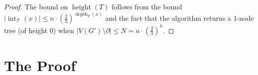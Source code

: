 \documentclass{patmorin}
\newcommand{\pat}[1]{\textcolor{Blue}{[Pat: #1]}}
\DeclareMathOperator{\sep}{sn}
\DeclareMathOperator{\tw}{tw}
\DeclareMathOperator{\depth}{depth}
\DeclareMathOperator{\height}{height}
\DeclareMathOperator{\interior}{int}
\begin{document}
\begin{proof}
  The bound on $\height(T)$ follows from the bound $|\interior_{\mathcal{T}}(x)|\le n\cdot (\tfrac{2}{3})^{\depth_T(x)}$ and the fact that the algorithm returns a 1-node tree (of height $0$) when $|V(G')\setminus\partial|\le N=n\cdot(\tfrac{2}{3})^h$.
\end{proof}










\section{The Proof}

\end{document}
